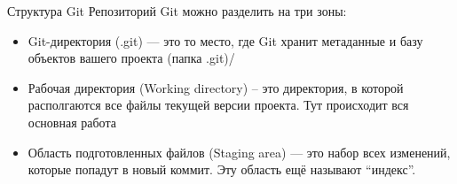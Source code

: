 \begin{frame}{Структура Git}
    Репозиторий Git можно разделить на три зоны:
    \begin{itemize}
        \item
              Git-директория (.git) — это то место, где Git хранит метаданные и базу объектов вашего проекта (папка .git)/
        \item
              Рабочая директория (Working directory) -- это директория, в которой располгаются все файлы текущей версии проекта. Тут происходит вся основная работа
        \item
              Область подготовленных файлов (Staging area) — это набор всех изменений, которые попадут в новый коммит. Эту область ещё называют “индекс”.
    \end{itemize}
\end{frame}